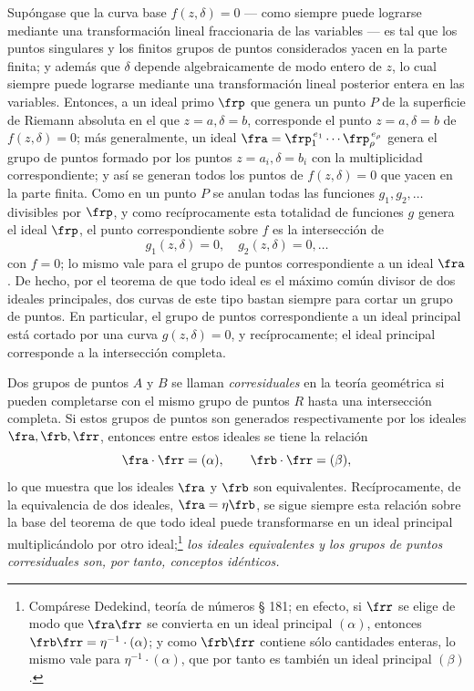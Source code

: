 \documentclass[11pt]{article}
\begin{document}
Supóngase que la curva base \(f(z,\delta)=0\) --- como siempre puede lograrse mediante una transformación lineal fraccionaria de las variables --- es tal que los puntos singulares y los finitos grupos de puntos considerados yacen en la parte finita; y además que \(\delta\) depende algebraicamente de modo entero de \(z\), lo cual siempre puede lograrse mediante una transformación lineal posterior entera en las variables. Entonces, a un ideal primo \(\frp\) que genera un punto \(P\) de la superficie de Riemann absoluta en el que \(z=a,\delta=b\), corresponde el punto \(z=a,\delta=b\) de \(f(z,\delta)=0\); más generalmente, un ideal \(\fra=\frp_1^{\,e_1}\cdots\frp_\rho^{\,e_\rho}\) genera el grupo de puntos formado por los puntos \(z=a_i,\delta=b_i\) con la multiplicidad correspondiente; y así se generan todos los puntos de \(f(z,\delta)=0\) que yacen en la parte finita. Como en un punto \(P\) se anulan todas las funciones \(g_1,g_2,\ldots\) divisibles por \(\frp\), y como recíprocamente esta totalidad de funciones \(g\) genera el ideal \(\frp\), el punto correspondiente sobre \(f\) es la intersección de
\[
g_1(z,\delta)=0,\quad g_2(z,\delta)=0,\ldots
\]
con \(f=0\); lo mismo vale para el grupo de puntos correspondiente a un ideal \(\fra\). De hecho, por el teorema de que todo ideal es el máximo común divisor de dos ideales principales, dos curvas de este tipo bastan siempre para cortar un grupo de puntos. En particular, el grupo de puntos correspondiente a un ideal principal está cortado por una curva \(g(z,\delta)=0\), y recíprocamente; el ideal principal corresponde a la intersección completa.

Dos grupos de puntos \(A\) y \(B\) se llaman \emph{corresiduales} en la teoría geométrica si pueden completarse con el mismo grupo de puntos \(R\) hasta una intersección completa. Si estos grupos de puntos son generados respectivamente por los ideales \(\fra,\frb,\frr\), entonces entre estos ideales se tiene la relación
\[
\fra\cdot\frr=(\alpha),\qquad \frb\cdot\frr=(\beta),
\]
lo que muestra que los ideales \(\fra\) y \(\frb\) son equivalentes. Recíprocamente, de la equivalencia de dos ideales, \(\fra=\eta\frb\), se sigue siempre esta relación sobre la base del teorema de que todo ideal puede transformarse en un ideal principal multiplicándolo por otro ideal;\footnote{Compárese Dedekind, teoría de números § 181; en efecto, si \(\frr\) se elige de modo que \(\fra\frr\) se convierta en un ideal principal \((\alpha)\), entonces \(\frb\frr=\eta^{-1}\cdot(\alpha)\); y como \(\frb\frr\) contiene sólo cantidades enteras, lo mismo vale para \(\eta^{-1}\cdot(\alpha)\), que por tanto es también un ideal principal \((\beta)\).} \emph{los ideales equivalentes y los grupos de puntos corresiduales son, por tanto, conceptos idénticos.}
\end{document}
